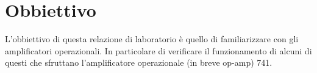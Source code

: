 \section*{Obbiettivo}

L'obbiettivo di questa relazione di laboratorio è quello di familiarizzare con gli amplificatori operazionali. In particolare di verificare il funzionamento di alcuni di questi che sfruttano l'amplificatore operazionale (in breve op-amp) 741.
